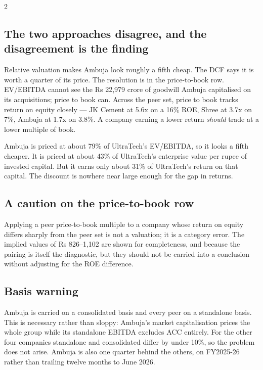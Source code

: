 \begin{paracol}{2}
\subsection{The two approaches disagree, and the disagreement is the finding}

Relative valuation makes Ambuja look roughly a fifth cheap. The DCF says it is worth
a quarter of its price. The resolution is in the price-to-book row. EV/EBITDA cannot
see the Rs 22,979 crore of goodwill Ambuja capitalised on its acquisitions; price to
book can. Across the peer set, price to book tracks return on equity closely — JK
Cement at 5.6x on a 16\% ROE, Shree at 3.7x on 7\%, Ambuja at 1.7x on 3.8\%. A
company earning a lower return \emph{should} trade at a lower multiple of book.

\begin{keybox}
Ambuja is priced at about 79\% of UltraTech's EV/EBITDA, so it looks a fifth cheaper.
It is priced at about 43\% of UltraTech's enterprise value per rupee of invested
capital. But it earns only about 31\% of UltraTech's return on that capital. The
discount is nowhere near large enough for the gap in returns.
\end{keybox}

\subsection{A caution on the price-to-book row}

Applying a peer price-to-book multiple to a company whose return on equity differs
sharply from the peer set is not a valuation; it is a category error. The implied
values of Rs 826--1,102 are shown for completeness, and because the pairing is itself
the diagnostic, but they should not be carried into a conclusion without adjusting
for the ROE difference.

\subsection{Basis warning}

Ambuja is carried on a consolidated basis and every peer on a standalone basis. This
is necessary rather than sloppy: Ambuja's market capitalisation prices the whole
group while its standalone EBITDA excludes ACC entirely. For the other four companies
standalone and consolidated differ by under 10\%, so the problem does not arise.
Ambuja is also one quarter behind the others, on FY2025-26 rather than trailing
twelve months to June 2026.


\end{paracol}

